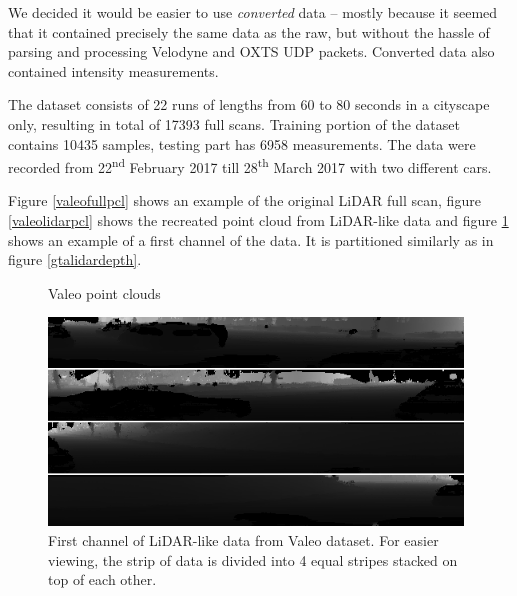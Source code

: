 We decided it would be easier to use {\em converted} data -- mostly because it seemed that it contained precisely the same data as the raw, but without the hassle of parsing and processing Velodyne and OXTS UDP packets. Converted data also contained intensity measurements.

The dataset consists of 22 runs of lengths from 60 to 80 seconds in a cityscape only, resulting in total of 17393 full scans. Training portion of the dataset contains 10435 samples, testing part has 6958 measurements. The data were recorded from 22\textsuperscript{nd} February 2017 till 28\textsuperscript{th} March 2017 with two different cars.

Figure \ref{valeofullpcl} shows an example of the original LiDAR full scan, figure \ref{valeolidarpcl} shows the recreated point cloud from LiDAR-like data and figure \ref{valeolidardepth} shows an example of a first channel of the data. It is partitioned similarly as in figure \ref{gtalidardepth}.


\begin{figure}
\centering
{}
\hfil
{}
\caption{Valeo point clouds}
\end{figure}

\begin{figure}
\centering
\includegraphics[width=0.98\textwidth,keepaspectratio]{img/valeolidardepth.png}
\caption[First channel of LiDAR-like data from Valeo dataset]{First channel of LiDAR-like data from Valeo dataset. For easier viewing, the strip of data is divided into 4 equal stripes stacked on top of each other.}
\label{valeolidardepth}
\end{figure}


